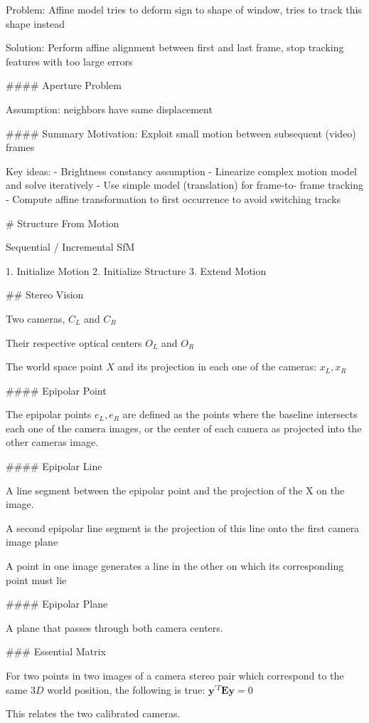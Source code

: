 Problem:  Affine model tries to deform sign to shape of window, tries to track this shape instead

Solution: Perform affine alignment between first and last frame, stop tracking features with too large errors

#### Aperture Problem

Assumption: neighbors have same displacement

#### Summary
Motivation: Exploit small motion between subsequent (video) frames

Key ideas:
- Brightness constancy assumption
- Linearize complex motion model and solve iteratively
- Use simple model (translation) for frame-to- frame tracking
- Compute affine transformation to first occurrence to avoid switching tracks

# Structure From Motion

Sequential / Incremental SfM

1. Initialize Motion
2. Initialize Structure
3. Extend Motion

## Stereo Vision

Two cameras, $C_L$ and $C_R$

Their respective optical centers $O_L$ and $O_R$

The world space point $X$ and its projection in each one of the cameras: $x_L, x_R$

#### Epipolar Point

The epipolar points $e_L, e_R$ are defined as the points where the baseline intersects each one of the camera images, or the center of each camera as projected into the other cameras image.

#### Epipolar Line

A line segment between the epipolar point and the projection of the X on the image.

A second epipolar line segment is the projection of this line onto the first camera image plane

A point in one image generates a line in the other on which its corresponding point must lie

#### Epipolar Plane

A plane that passes through both camera centers.

### Essential Matrix

For two points in two images of a camera stereo pair which correspond to the same $3D$ world position, the following is true: 
$\mathbf{y}^{\prime T}\mathbf{Ey}=0$

This relates the two calibrated cameras.

